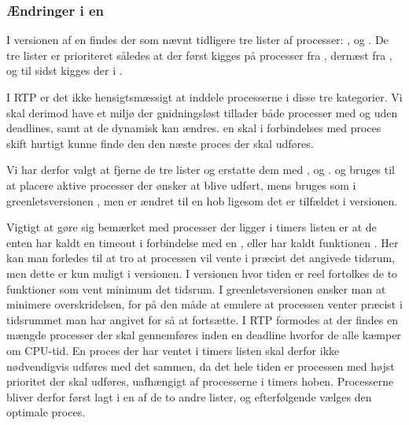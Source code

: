 \subsubsection{Ændringer i \sched en}
I  versionen af \sched en findes der som nævnt tidligere tre lister af processer: ,  og . De tre lister er prioriteret således at der først kigges på processer fra , dernæst fra , og til sidst kigges der i .

I RTP er det ikke hensigtsmæssigt at inddele processerne i disse tre  kategorier. Vi skal derimod have et miljø der gnidningsløst tillader både processer med og uden deadlines, samt at de dynamisk kan ændres. \sched en skal i forbindelses med proces skift hurtigt kunne finde den den næste proces der skal udføres.

Vi har derfor valgt at fjerne  de tre lister og erstatte dem  med ,   og .  og    bruges til at placere  aktive processer der ønsker at blive udført, mens   bruges som i greenletsversionen , men er ændret til en  hob ligesom det er tilfældet i \des versionen. 

Vigtigt at gøre sig bemærket med processer der ligger i timers  listen er at de enten har kaldt en timeout i forbindelse med en , eller har kaldt funktionen  . Her kan man forledes til at tro at processen vil vente i præcist det angivede tidsrum, men dette er kun  muligt i \des versionen. I versionen hvor tiden er reel fortolkes de to funktioner som vent  minimum det tidsrum. I greenletsversionen ønsker man at minimere overskridelsen, for på den måde at emulere at processen venter præcist i tidsrummet man har angivet for så at fortsætte. I RTP formodes at der findes en mængde processer der skal gennemføres inden en deadline hvorfor de alle kæmper om CPU-tid. En proces der har ventet i timers listen skal derfor ikke nødvendigvis udføres med det sammen, da det hele tiden er processen med højst prioritet der skal udføres, uafhængigt af processerne i timers hoben. Processerne bliver derfor først lagt i en af de to andre lister, og efterfølgende vælges den optimale proces.


